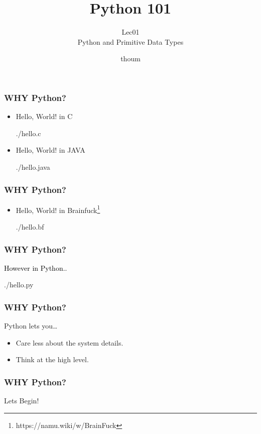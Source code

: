 \documentclass{beamer}
\title{Python 101}
\subtitle{Lec01 \\ Python and Primitive Data Types}
\author{thoum}
\begin{document}
\frame{\titlepage}

\begin{frame}
\frametitle{WHY Python?}
\begin{itemize}
    \item
    Hello, World! in C
    \begin{lstinputlisting}
      {./hello.c}
    \end{lstinputlisting}
    \item
    Hello, World! in JAVA
    \begin{lstinputlisting}
      {./hello.java}
    \end{lstinputlisting}
\end{itemize}
\end{frame}

\begin{frame}
\frametitle{WHY Python?}
\begin{itemize}
    \item
      Hello, World! in
      Brainfuck\footnote{\footnotesize{https://namu.wiki/w/BrainFuck}}
    \begin{lstinputlisting}
      {./hello.bf}
    \end{lstinputlisting}
\end{itemize}
\end{frame}

\begin{frame}
\frametitle{WHY Python?}
  \textcolor{black}{\LARGE{However in Python..}}
\end{frame}
\begin{frame}
    \begin{lstinputlisting}
      {./hello.py}
    \end{lstinputlisting}
\end{frame}

\begin{frame}
\frametitle{WHY Python?}
  {\Large{Python lets you\ldots}}
  \begin{itemize}
    \item Care less about the system details.
    \item Think at the high level.
  \end{itemize}
\end{frame}

\begin{frame}
\frametitle{WHY Python?}
  \begin{center}
  {\Large{Lets Begin!}}
  \end{center}

\end{frame}
\end{document}

